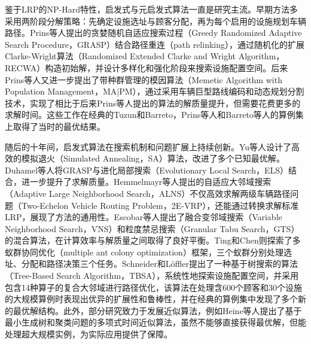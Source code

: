 \documentclass[fontset=none]{ctexart}
\begin{document}
鉴于LRP的NP-Hard特性，启发式与元启发式算法一直是研究主流。早期方法多采用两阶段分解策略：先确定设施选址与顾客分配，再为每个启用的设施规划车辆路径。Prins等人提出的贪婪随机自适应搜索过程（Greedy Randomized Adaptive Search Procedure，GRASP）结合路径重连（path relinking），通过随机化的扩展Clarke-Wright算法（Randomized Extended Clarke and Wright Algorithm，RECWA）构造初始解，并设计多样化和强化阶段来搜索设施配置空间\cite{nguyenSolvingTwoechelonLocation2012}。后来Prins等人又进一步提出了带种群管理的模因算法（Memetic Algorithm with Population Management，MA|PM）\cite{prinsMemeticAlgorithmPopulation2006}，通过采用车辆巨型路线编码和动态规划分割技术，实现了相比于后来Prins等人提出的算法的解质量提升，但需要花费更多的求解时间\cite{prinsSolvingCapacitatedLocationRouting2007}。这些工作在经典的Tuzun和Barreto\cite{tuzunTwophaseTabuSearch1999}，Prins等人\cite{nguyenSolvingTwoechelonLocation2012, prinsSolvingCapacitatedLocationRouting2007}和Barreto等人\cite{barretoUsingClusteringAnalysis2007}的算例集上取得了当时的最优结果。

随后的十年间，启发式算法在搜索机制和问题扩展上持续创新。Yu等人设计了高效的模拟退火（Simulated Annealing，SA）算法，改进了多个已知最优解\cite{yuSimulatedAnnealingHeuristic2010}。Duhamel等人将GRASP与进化局部搜索（Evolutionary Local Search，ELS）结合，进一步提升了求解质量\cite{duhamelGRASPxELSApproachCapacitated2010}。Hemmelmayr等人提出的自适应大邻域搜索（Adaptive Large Neighborhood Search，ALNS）不仅高效求解两级车辆路径问题（Two-Echelon Vehicle Routing Problem，2E-VRP），还能通过转换求解标准LRP，展现了方法的通用性\cite{hemmelmayrAdaptiveLargeNeighborhood2012}。Escobar等人提出了融合变邻域搜索（Variable Neighborhood Search，VNS）和粒度禁忌搜索（Granular Tabu Search，GTS）的混合算法，在计算效率与解质量之间取得了良好平衡\cite{escobarGranularVariableTabu2014, escobarTwophaseHybridHeuristic2013}。Ting和Chen则探索了多蚁群协同优化（multiple ant colony optimization）框架，三个蚁群分别处理选址、分配和路径决策三个任务\cite{tingMultipleAntColony2013}。Schneider和Löffler提出了一种基于树搜索的算法（Tree-Based Search Algorithm，TBSA），系统性地探索设施配置空间，并采用包含14种算子的复合大邻域进行路径优化，该算法在处理含600个顾客和30个设施的大规模算例时表现出优异的扩展性和鲁棒性，并在经典的算例集中发现了多个新的最优解结构\cite{schneiderLargeCompositeNeighborhoods2019}。此外，部分研究致力于发展近似算法，例如Heine等人提出了基于最小生成树和聚类问题的多项式时间近似算法，虽然不能够直接获得最优解，但能处理超大规模实例，为实际应用提供了保障\cite{carrascoheineBifactorApproximationLocation2023}。
\end{document}
